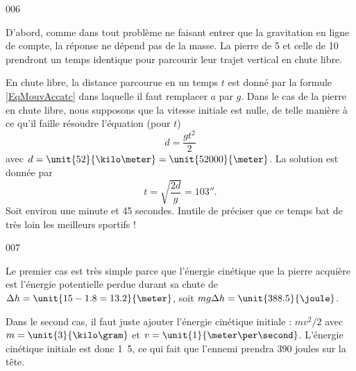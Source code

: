 \documentclass{article}
\begin{document}
\begin{corrige}{006}

D'abord, comme dans tout problème ne faisant entrer que la gravitation en ligne de compte, la réponse ne dépend pas de la masse. La pierre de \unit{5}{\kilogram} et celle de \unit{10}{\kilogram} prendront un temps identique pour parcourir leur trajet vertical en chute libre.

En chute libre, la distance parcourue en un temps $t$ est donné par la formule \eqref{EqMouvAccatc} dans laquelle il faut remplacer $a$ par $g$. Dans le cas de la pierre en chute libre, nous supposons que la vitesse initiale est nulle, de telle manière à ce qu'il faille résoudre l'équation (pour $t$)
\[ 
  d=\frac{ gt^2 }{ 2 }
\]
avec $d=\unit{52}{\kilo\meter}=\unit{52000}{\meter}$. La solution est donnée par
\[ 
  t=\sqrt{\frac{ 2d }{ g }}=\unit{103}{\second}.
\]
Soit environ une minute et 45 secondes. Inutile de préciser que ce temps bat de très loin les meilleurs sportifs !

\end{corrige}
\begin{corrige}{007}

Le premier cas est très simple parce que l'énergie cinétique que la pierre acquière est l'énergie potentielle perdue durant sa chute de $\Delta h=\unit{15-1.8=13.2}{\meter}$, soit $mg\Delta h=\unit{388.5}{\joule}$.

Dans le second cas, il faut juste ajouter l'énergie cinétique initiale : $mv^2/2$ avec $m=\unit{3}{\kilo\gram}$ et $v=\unit{1}{\meter\per\second}$. L'énergie cinétique initiale est donc \unit{1.5}{\joule}, ce qui fait que l'ennemi prendra $390$ joules sur la tête.

\end{corrige}


\end{document}
